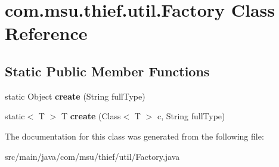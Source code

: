 \hypertarget{classcom_1_1msu_1_1thief_1_1util_1_1Factory}{\section{com.\-msu.\-thief.\-util.\-Factory Class Reference}
\label{classcom_1_1msu_1_1thief_1_1util_1_1Factory}
}
\subsection*{Static Public Member Functions}
\begin{DoxyCompactItemize}
\item 
\hypertarget{classcom_1_1msu_1_1thief_1_1util_1_1Factory_a6f91155d61cb2c8290d089162434de62}{static Object {\bfseries create} (String full\-Type)}\label{classcom_1_1msu_1_1thief_1_1util_1_1Factory_a6f91155d61cb2c8290d089162434de62}

\item 
\hypertarget{classcom_1_1msu_1_1thief_1_1util_1_1Factory_a5ee4815cc5f9ad36e6d3dc4e920d63d0}{static$<$ T $>$ T {\bfseries create} (Class$<$ T $>$ c, String full\-Type)}\label{classcom_1_1msu_1_1thief_1_1util_1_1Factory_a5ee4815cc5f9ad36e6d3dc4e920d63d0}

\end{DoxyCompactItemize}


The documentation for this class was generated from the following file\-:\begin{DoxyCompactItemize}
\item 
src/main/java/com/msu/thief/util/Factory.\-java\end{DoxyCompactItemize}
